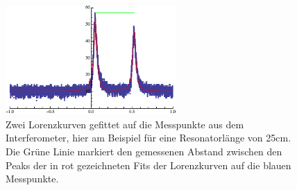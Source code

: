 \documentclass[bigchapter,colorback,accentcolor=tud4b,linedtoc,11pt]{tudreport}
\numberwithin{equation}{subsection}
\begin{document}
\begin{figure}[h!]
  \centering
    \includegraphics[width=65mm]{img/Modenabstand25cm.png}
  \caption{Zwei Lorenzkurven gefittet auf die Messpunkte aus dem Interferometer, hier am Beispiel für eine Resonatorlänge von 25cm. Die Grüne Linie markiert den gemessenen Abstand zwischen den Peaks der in rot gezeichneten Fits der Lorenzkurven auf die blauen Messpunkte.}
\end{figure}
\FloatBarrier
\end{document}
